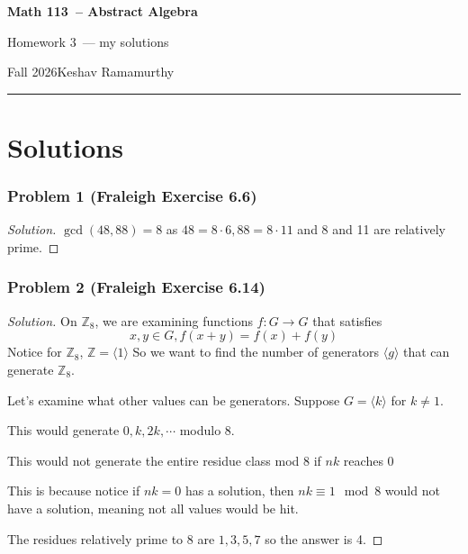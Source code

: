 \documentclass[11pt]{article}
\newcommand{\studentname}{Keshav Ramamurthy}
\newcommand{\coursename}{Math 113}
\newcommand{\courselongname}{Abstract Algebra}
\newcommand{\assignment}{Homework 3}
\newcommand{\term}{Fall 2026}
\newcommand{\1}{\mathbf{1}}
\theoremstyle{definition}
\newenvironment{solution}{\begin{proof}[Solution]}{\end{proof}}
\begin{document}
\begin{center}
  {\Large\sffamily\bfseries \coursename\ -- \courselongname}\par\vspace{3pt}
  {\sffamily \assignment\ — my solutions}\par\vspace{3pt}
  {\small\sffamily \term\quad\textbullet\quad \studentname}
\end{center}
\medskip
\hrule
\bigskip


\clearpage

\section*{Solutions}
\subsubsection*{Problem 1 (Fraleigh Exercise 6.6)}
\begin{solution}
    $\gcd(48, 88) = 8$ as $48 = 8 \cdot 6, 88 = 8 \cdot 11$ and 8 and 11 are relatively
    prime.
\end{solution}
\subsubsection*{Problem 2 (Fraleigh Exercise 6.14)}
\begin{solution}
    On $\mathbb{Z}_8$, we are examining functions $f : G \rightarrow G$ that satisfies $$x, y \in G,  f(x + y) = f(x) + f(y)$$
    Notice for $\mathbb{Z}_8$, $\mathbb{Z} = \langle 1 \rangle$
    So we want to find the number of generators $\langle g \rangle$ that can generate
    $\mathbb{Z}_8.$
\par    Let's examine what other values can be generators. Suppose $G = \langle k
\rangle $ for $k\ne 1.$
\par  This would generate $0, k, 2k, \cdots$ modulo 8.
\par This would not generate the entire residue class mod 8 if $nk$ reaches $0$ 
\par This is because notice if $nk = 0$ has a solution, then $nk\equiv1 \mod 8$ would not
have a solution, meaning not all values would be hit.
\par The residues relatively prime to $8$ are $1, 3, 5, 7$ so the answer is 4.
\end{solution}
\end{document}
